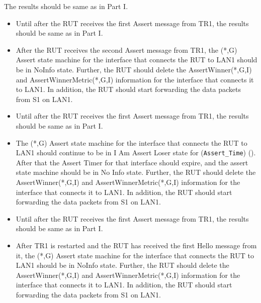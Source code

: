 \documentclass[11pt]{report}
\begin{document}

The results should be same as in Part I.


\begin{itemize}

  \item Until after the RUT receives the first Assert message from TR1, the
  results should be same as in Part I.

  \item After the RUT receives the second Assert message from TR1, the (*,G)
  Assert state machine for the interface that connects the RUT to LAN1 should
  be in NoInfo state.
  Further, the RUT should delete the AssertWinner(*,G,I) and
  AssertWinnerMetric(*,G,I) information for the interface that connects it to
  LAN1.
  In addition, the RUT should start forwarding the data packets from S1 on
  LAN1.

\end{itemize}


\begin{itemize}

  \item Until after the RUT receives the first Assert message from TR1, the
  results should be same as in Part I.

  \item The (*,G) Assert state machine for the interface that connects the RUT
  to LAN1 should continue to be in I Am Assert Loser state for
  (\verb=Assert_Time=) ({\PimsmAssertTime}). After that the Assert Timer for
  that interface should expire, and the assert state machine should be in No
  Info state.
  Further, the RUT should delete the AssertWinner(*,G,I) and
  AssertWinnerMetric(*,G,I) information for the interface that connects it to
  LAN1.
  In addition, the RUT should start forwarding the data packets from S1 on
  LAN1.

\end{itemize}


\begin{itemize}

  \item Until after the RUT receives the first Assert message from TR1, the
  results should be same as in Part I.

  \item After TR1 is restarted and the RUT has received the first Hello
  message from it, the (*,G) Assert state machine for the
  interface that connects the RUT to LAN1 should be in NoInfo state.
  Further, the RUT should delete the AssertWinner(*,G,I) and
  AssertWinnerMetric(*,G,I) information for the interface that connects it to
  LAN1.
  In addition, the RUT should start forwarding the data packets from S1 on
  LAN1.

\end{itemize}
\end{document}
